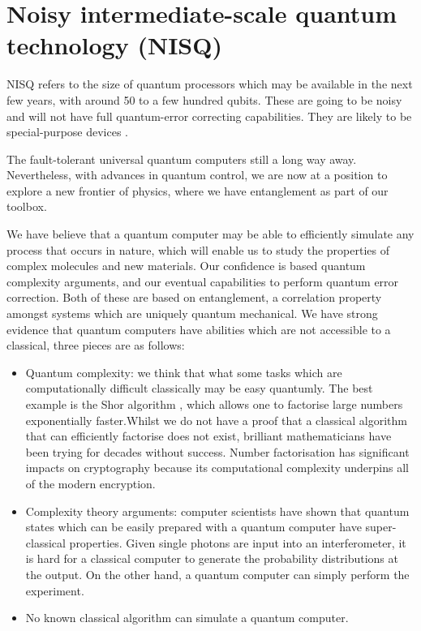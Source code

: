 \section{Noisy intermediate-scale quantum technology (NISQ)}\label{sec:NISQ}

NISQ refers to the size of quantum processors which may be available in the next few years, with around 50 to a few hundred qubits. These are going to be noisy and will not have full quantum-error correcting capabilities. They are likely to be special-purpose devices \cite{bib:preskill2018quantum}.

The fault-tolerant universal quantum computers still a long way away. Nevertheless, with advances in quantum control, we are now at a position to explore a new frontier of physics, where we have entanglement as part of our toolbox.

We have believe that a quantum computer may be able to efficiently simulate any process that occurs in nature, which will enable us to study the properties of complex molecules and new materials. Our confidence is based quantum complexity arguments, and our eventual capabilities to perform quantum error correction. Both of these are based on entanglement, a correlation property amongst systems which are uniquely quantum mechanical. We have strong evidence that quantum computers have abilities which are not accessible to a classical, three pieces are as follows:

\begin{itemize}
\item Quantum complexity: we think that what some tasks which are computationally difficult classically may be easy quantumly. The best example is the Shor algorithm \cite{bib:shor1994algorithms}, which allows one to factorise large numbers exponentially  faster.Whilst we do not have a proof that a classical algorithm that can efficiently factorise does not exist, brilliant mathematicians have been trying for decades without success. Number factorisation has significant impacts on cryptography because its computational complexity underpins all of the modern encryption. 
\item Complexity theory arguments: computer scientists have shown that quantum states which can be easily prepared with a quantum computer have super-classical properties. Given single photons are input into an interferometer, it is hard for a classical computer to generate the probability distributions at the output. On the other hand, a quantum computer can simply perform the experiment.
\item No known classical algorithm can simulate a quantum computer.
\end{itemize}

